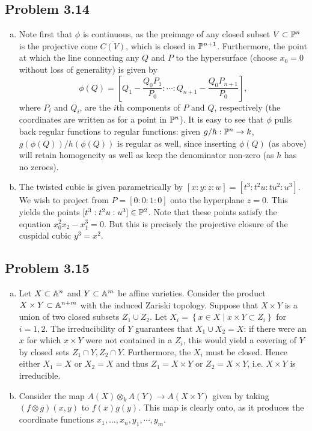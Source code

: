 \documentclass{../mathnotes}
\begin{document}
\subsection*{Problem 3.14}
\begin{enumerate}[(a)]
    \item Note first that $\phi$ is continuous, as the preimage of any closed subset $V\subset \mathbb{P}^n$
        is the projective cone $\overline{C(V)}$, which is closed in $\mathbb{P}^{n+1}$. 
        Furthermore, the point at which the line connecting any $Q$ and $P$ to the hypersurface
        (choose $x_0=0$ without loss of generality) is given by 
        \[\phi(Q)=[Q_1-\frac{Q_0P_1}{P_0}:\cdots:Q_{n+1}-\frac{Q_0P_{n+1}}{P_0}],\]
        where $P_i$ and $Q_i$, are the $i$th components of $P$ and $Q$, respectively (the coordinates
        are written as for a point in $\mathbb{P}^n$).
        It is easy to see that $\phi$
        pulls back regular functions to regular functions: given $g/h:\mathbb{P}^n\to k$, $g(\phi(Q))/h(\phi(Q))$
        is regular as well, since inserting $\phi(Q)$ (as above) will retain homogeneity as well as
        keep the denominator non-zero (as $h$ has no zeroes).
    \item The twisted cubic is given parametrically by $[x:y:z:w]=[t^3:t^2u:tu^2:u^3]$. We wish
        to project from $P=[0:0:1:0]$ onto the hyperplane $z=0$. This yields the points
        $[t^3:t^2u:u^3]\in\mathbb{P}^2$. Note that these points satisfy the equation $x_0^2x_2-x_1^3=0$.
        But this is precisely the projective closure of the cuspidal cubic $y^3=x^2$.
\end{enumerate}


\subsection*{Problem 3.15}
\begin{enumerate}[(a)]
    \item Let $X\subset\mathbb{A}^n$ and $Y\subset\mathbb{A}^m$ be affine varieties. Consider the product
        $X\times Y\subset\mathbb{A}^{n+m}$ with the induced Zariski topology. Suppose that $X\times Y$
        is a union of two closed subsets $Z_1\cup Z_2$. Let $X_i=\left\{ x\in X\mid x\times Y\subset Z_i \right\}$
        for $i=1,2$. The irreducibility of $Y$ guarantees that $X_1\cup X_2=X$: if there were
        an $x$ for which $x\times Y$ were not contained in a $Z_i$, this would yield a
        covering of $Y$ by closed sets $Z_1\cap Y,Z_2\cap Y$. Furthermore, the $X_i$ must be
        closed.
        Hence either $X_1=X$ or $X_2=X$ and thus $Z_1=X\times Y$ or
        $Z_2=X\times Y$, i.e. $X\times Y$ is irreducible.
    \item Consider the map $A(X)\otimes_kA(Y)\to A(X\times Y)$ given by taking $(f\otimes g)(x,y)$
        to $f(x)g(y)$. This map is clearly onto, as it produces the coordinate functions
        $x_1,\ldots,x_n,y_1,\cdots,y_m$.
\end{enumerate}
\end{document}
